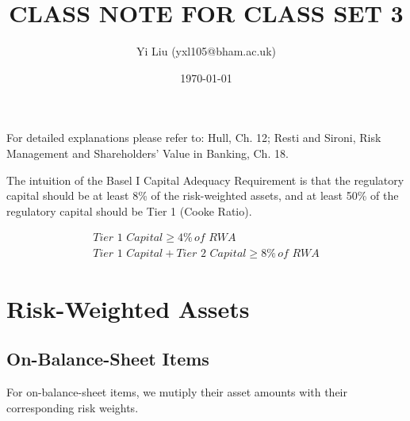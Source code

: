 \documentclass[12pt]{article}
\author{Yi Liu (yxl105@bham.ac.uk)}
\date{\today}
\title{CLASS NOTE FOR CLASS SET 3}
\begin{document}
\maketitle

For detailed explanations please refer to: Hull, Ch. 12; Resti and Sironi, Risk Management and Shareholders’ Value in Banking, Ch. 18.

The intuition of the Basel I Capital Adequacy Requirement is that the regulatory capital should be at least 8\% of the risk-weighted assets, and at least 50\% of the regulatory capital should be Tier 1 (Cooke Ratio).

\begin{align*}
  \textit{Tier 1 Capital} \geq 4\% \, \textit{of RWA} \\
  \textit{Tier 1 Capital} + \textit{Tier 2 Capital} \geq 8\% \, \textit{of RWA}
\end{align*}

\tableofcontents

\section{Risk-Weighted Assets}

\subsection{On-Balance-Sheet Items}

For on-balance-sheet items, we mutiply their asset amounts with their corresponding risk weights.
\end{document}
